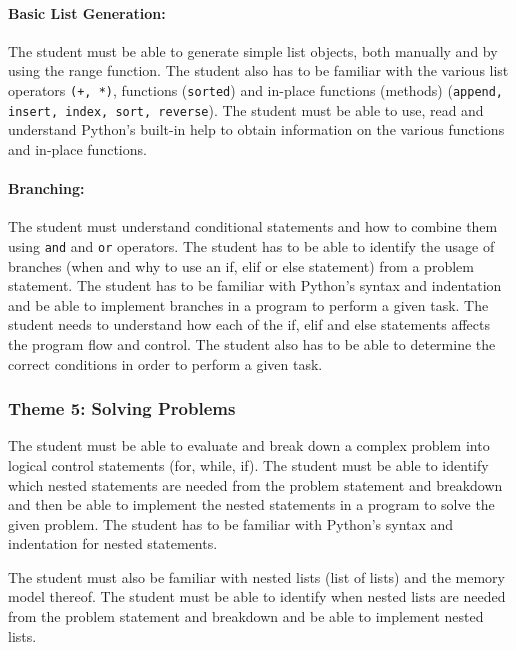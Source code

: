             \paragraph{Basic List Generation:}
                The student must be able to generate simple list objects, both
                manually and by using the range function. The student also has
                to be familiar with the various list operators \texttt{(+, *)},
                functions (\texttt{sorted}) and in-place functions (methods)
                (\texttt{append, insert, index, sort, reverse}). The student
                must be able to use, read and understand Python's built-in help
                to obtain information on the various functions and in-place
                functions.

            \paragraph{Branching:}
                The student must understand conditional statements and how to
                combine them using \texttt{and} and \texttt{or} operators. The
                student has to be able to identify the usage of branches (when
                and why to use an if, elif or else statement) from a problem
                statement. The student has to be familiar with Python's syntax
                and indentation and be able to implement branches in a program
                to perform a given task. The student needs to understand how
                each of the if, elif and else statements affects the program
                flow and control. The student also has to be able to determine
                the correct conditions in order to perform a given task.

        \subsubsection{Theme 5: Solving Problems}
            The student must be able to evaluate and break down a complex
            problem into logical control statements (for, while, if). The
            student must be able to identify which nested statements are needed
            from the problem statement and breakdown and then be able to
            implement the nested statements in a program to solve the given
            problem. The student has to be familiar with Python's syntax and
            indentation for nested statements.

            The student must also be familiar with nested lists (list of lists)
            and the memory model thereof. The student must be able to identify
            when nested lists are needed from the problem statement and
            breakdown and be able to implement nested lists.

